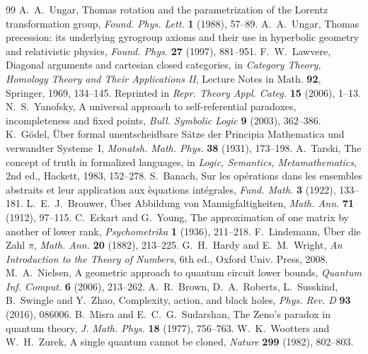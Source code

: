 \documentclass[11pt,reqno]{amsart}
\theoremstyle{definition}
\theoremstyle{remark}
\numberwithin{equation}{section}
\begin{document}
\begin{thebibliography}{99}
 A.~A.~Ungar, Thomas rotation and the parametrization of the Lorentz transformation group, \emph{Found. Phys. Lett.} \textbf{1} (1988), 57--89.
 A.~A.~Ungar, Thomas precession: its underlying gyrogroup axioms and their use in hyperbolic geometry and relativistic physics, \emph{Found. Phys.} \textbf{27} (1997), 881--951.
 F.~W.~Lawvere, Diagonal arguments and cartesian closed categories, in \emph{Category Theory, Homology Theory and Their Applications II}, Lecture Notes in Math. \textbf{92}, Springer, 1969, 134--145. Reprinted in \emph{Repr. Theory Appl. Categ.} \textbf{15} (2006), 1--13.
 N.~S.~Yanofsky, A universal approach to self-referential paradoxes, incompleteness and fixed points, \emph{Bull. Symbolic Logic} \textbf{9} (2003), 362--386.
 K.~G\"odel, \"Uber formal unentscheidbare S\"atze der Principia Mathematica und verwandter Systeme~I, \emph{Monatsh. Math. Phys.} \textbf{38} (1931), 173--198.
 A.~Tarski, The concept of truth in formalized languages, in \emph{Logic, Semantics, Metamathematics}, 2nd ed., Hackett, 1983, 152--278.
 S.~Banach, Sur les op\'erations dans les ensembles abstraits et leur application aux \`equations int\'egrales, \emph{Fund. Math.} \textbf{3} (1922), 133--181.
 L.~E.~J.~Brouwer, \"Uber Abbildung von Mannigfaltigkeiten, \emph{Math. Ann.} \textbf{71} (1912), 97--115.
 C.~Eckart and G.~Young, The approximation of one matrix by another of lower rank, \emph{Psychometrika} \textbf{1} (1936), 211--218.
 F.~Lindemann, \"Uber die Zahl $\pi$, \emph{Math. Ann.} \textbf{20} (1882), 213--225.
 G.~H.~Hardy and E.~M.~Wright, \emph{An Introduction to the Theory of Numbers}, 6th ed., Oxford Univ. Press, 2008.
 M.~A.~Nielsen, A geometric approach to quantum circuit lower bounds, \emph{Quantum Inf. Comput.} \textbf{6} (2006), 213--262.
 A.~R.~Brown, D.~A.~Roberts, L.~Susskind, B.~Swingle and Y.~Zhao, Complexity, action, and black holes, \emph{Phys. Rev. D} \textbf{93} (2016), 086006.
 B.~Misra and E.~C.~G.~Sudarshan, The Zeno's paradox in quantum theory, \emph{J. Math. Phys.} \textbf{18} (1977), 756--763.
 W.~K.~Wootters and W.~H.~Zurek, A single quantum cannot be cloned, \emph{Nature} \textbf{299} (1982), 802--803.

\end{thebibliography}
\end{document}
